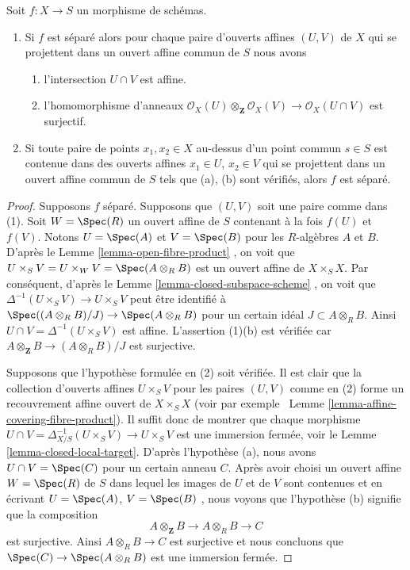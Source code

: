 \begin{lemma}
\label{lemma-characterize-separated}
Soit  $f : X \to S$  un morphisme de schémas.
\begin{enumerate}
\item Si  $f$  est séparé alors pour chaque paire d'ouverts affines  $(U, V)$ 
de  $X$  qui se projettent dans un ouvert affine commun de  $S$ 
nous avons
\begin{enumerate}
\item l'intersection  $U \cap V$  est affine.
\item l'homomorphisme d'anneaux  $\mathcal{O}_X(U) \otimes_{\mathbf{Z}} \mathcal{O}_X(V)
\to \mathcal{O}_X(U \cap V)$  est surjectif.
\end{enumerate}
\item Si toute paire de points  $x_1, x_2 \in X$  au-dessus d'un point commun  $s \in S$  est
contenue dans des ouverts affines  $x_1 \in U$,  $x_2 \in V$  qui se projettent
dans un ouvert affine commun de  $S$  tels que (a), (b) sont vérifiés,
alors  $f$  est séparé.
\end{enumerate}
\end{lemma}

\begin{proof}
Supposons  $f$  séparé. Supposons que  $(U, V)$  soit une paire comme
dans (1). Soit  $W = \Spec(R)$  un ouvert affine de  $S$  contenant à la fois
 $f(U)$  et  $f(V)$. Notons  $U = \Spec(A)$  et  $V = \Spec(B)$  pour les
 $R$-algèbres  $A$  et  $B$. D'après le Lemme  \ref{lemma-open-fibre-product} ,
on voit que  $U \times_S V = U \times_W V = \Spec(A \otimes_R B)$  est un ouvert affine de  $X \times_S X$. Par conséquent,
d'après le Lemme  \ref{lemma-closed-subspace-scheme} , on voit que  $\Delta^{-1}(U \times_S V) \to U \times_S V$  peut être identifié à
 $\Spec((A \otimes_R B)/J) \to \Spec(A \otimes_R B)$  pour un certain idéal  $J \subset A \otimes_R B$. Ainsi  $U \cap V = \Delta^{-1}(U \times_S V)$  est affine.
L'assertion (1)(b) est vérifiée car  $A \otimes_{\mathbf{Z}} B \to (A \otimes_R B)/J$  est surjective.

\medskip\noindent
Supposons que l'hypothèse formulée en (2) soit vérifiée. Il est clair que la
collection d'ouverts affines  $U \times_S V$  pour les paires  $(U, V)$  comme en
(2) forme un recouvrement affine ouvert de  $X \times_S X$  (voir par exemple
\ Lemme  \ref{lemma-affine-covering-fibre-product}). Il suffit donc de montrer que chaque morphisme
 $U \cap V = \Delta_{X/S}^{-1}(U \times_S V) \to U \times_S V$  est une immersion fermée, voir le Lemme  \ref{lemma-closed-local-target}. D'après
l'hypothèse (a), nous avons  $U \cap V = \Spec(C)$  pour un certain anneau  $C$.
Après avoir choisi un ouvert affine  $W = \Spec(R)$  de  $S$  dans lequel
les images de  $U$  et de  $V$  sont contenues et en écrivant  $U = \Spec(A)$,  $V = \Spec(B)$ ,
nous voyons que l'hypothèse (b) signifie que la composition
$$
A \otimes_{\mathbf{Z}} B \to A \otimes_R B \to C
$$
est surjective. Ainsi  $A \otimes_R B \to C$  est surjective et nous concluons que
 $\Spec(C) \to \Spec(A \otimes_R B)$  est une immersion fermée.
\end{proof}

